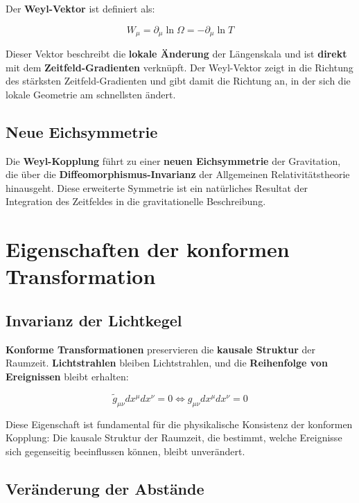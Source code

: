 \documentclass[12pt,a4paper]{report}
\begin{document}
Der \textbf{Weyl-Vektor} ist definiert als:

\begin{equation}
	W_\mu = \partial_\mu \ln \Omega = -\partial_\mu \ln T
\end{equation}

Dieser Vektor beschreibt die \textbf{lokale Änderung} der Längenskala und ist \textbf{direkt} mit dem \textbf{Zeitfeld-Gradienten} verknüpft. Der Weyl-Vektor zeigt in die Richtung des stärksten Zeitfeld-Gradienten und gibt damit die Richtung an, in der sich die lokale Geometrie am schnellsten ändert.

\subsection{Neue Eichsymmetrie}

Die \textbf{Weyl-Kopplung} führt zu einer \textbf{neuen Eichsymmetrie} der Gravitation, die über die \textbf{Diffeomorphismus-Invarianz} der Allgemeinen Relativitätstheorie hinausgeht. Diese erweiterte Symmetrie ist ein natürliches Resultat der Integration des Zeitfeldes in die gravitationelle Beschreibung.

\section{Eigenschaften der konformen Transformation}

\subsection{Invarianz der Lichtkegel}

\textbf{Konforme Transformationen} preservieren die \textbf{kausale Struktur} der Raumzeit. \textbf{Lichtstrahlen} bleiben Lichtstrahlen, und die \textbf{Reihenfolge von Ereignissen} bleibt erhalten:

\begin{equation}
	\tilde{g}_{\mu\nu} dx^\mu dx^\nu = 0 \Leftrightarrow g_{\mu\nu} dx^\mu dx^\nu = 0
\end{equation}

Diese Eigenschaft ist fundamental für die physikalische Konsistenz der konformen Kopplung: Die kausale Struktur der Raumzeit, die bestimmt, welche Ereignisse sich gegenseitig beeinflussen können, bleibt unverändert.

\subsection{Veränderung der Abstände}
\end{document}
